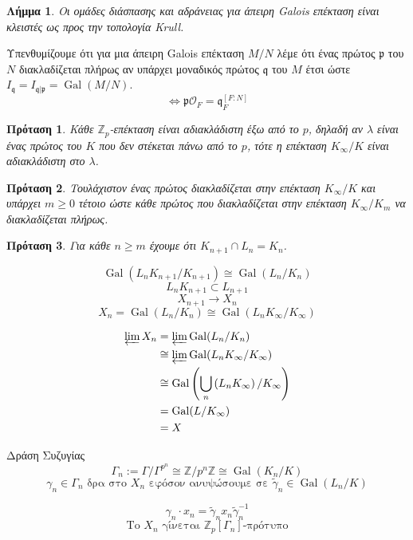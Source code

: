 \documentclass{beamer}
\newcommand {\tl}{\textlatin}
\newcommand{\Gal}{\operatorname{Gal}}
\newcommand{\Z}{\mathbb{Z}}
\newtheorem{lhmma}{Λήμμα}
\newtheorem{prop}{Πρόταση}
\begin{document}
\begin{frame}
\begin{lhmma}
Οι ομάδες διάσπασης και αδράνειας για άπειρη \tl{Galois} επέκταση είναι κλειστές ως προς την τοπολογία \tl{Krull}.
\end{lhmma}
\pause
Υπενθυμίζουμε ότι για μια άπειρη \tl{Galois} επέκταση $M/N$ λέμε ότι ένας πρώτος $\mathfrak{p}$ του $N$ διακλαδίζεται πλήρως αν υπάρχει μοναδικός πρώτος $\mathfrak{q}$ του $M$ έτσι ώστε $I_{\mathfrak q} = I_{\mathfrak q | \mathfrak p} = \Gal(M/N).$
$$\iff \mathfrak p \mathcal{O}_F = \mathfrak q_F^{[F:N]}$$
\pause 

\begin{prop}
    Κάθε $\Z_p$-επέκταση είναι αδιακλάδιστη έξω από το $p$, δηλαδή αν $\lambda$ είναι ένας πρώτος του $K$ που δεν στέκεται πάνω από το $p$, τότε η επέκταση $K_{\infty}/K$ είναι αδιακλάδιστη στο $\lambda$.
\end{prop}

\end{frame}

\begin{frame}
\begin{prop}
    Τουλάχιστον ένας πρώτος διακλαδίζεται στην επέκταση $K_\infty/K$ και υπάρχει $m\geq 0$ τέτοιο ώστε κάθε πρώτος που διακλαδίζεται στην επέκταση $K_\infty/K_m$ να διακλαδίζεται πλήρως.
\end{prop}

\pause
\begin{prop}
        Για κάθε $n\geq m$ έχουμε ότι $K_{n+1}\cap L_n = K_n$.
    \end{prop}
\pause
$$\Gal(L_nK_{n+1}/K_{n+1}) \cong \Gal(L_n/K_n)$$
$$L_n K_{n+1} \subset L_{n+1}$$
$$X_{n+1} \longrightarrow X_n$$
$$X_n = \Gal(L_n/K_n) \cong \Gal(L_nK_\infty/K_\infty)$$

\end{frame}

\begin{frame}
\begin{align*}
    \varprojlim X_n &= \varprojlim \Gal(L_n/K_n) \\
    &\cong  \varprojlim \Gal(L_n K_\infty/K_\infty) \\
    &\cong \Gal \left( \bigcup\limits_n\left(L_n K_\infty\right)/K_\infty \right) \\
    &= \Gal(L/K_\infty) \\
    &= X
\end{align*}
\pause 
\begin{block}{Δράση Συζυγίας}
$$\Gamma_n := \Gamma/\Gamma^{p^n} \cong \Z/p^n\Z \cong \Gal(K_n/K)$$
$$\gamma_n \in \Gamma_n \text{ δρα στο } X_n \text{ εφόσον ανυψώσουμε σε } \tilde{\gamma}_n \in \Gal(L_n/K)$$

$$\gamma_n \cdot x_n = \tilde{\gamma}_n x_n \tilde{\gamma}_n^{-1}$$
$$\text{Το } X_n \text{ γίνεται } \Z_p[\Gamma_n]\text{-πρότυπο}$$
\end{block}

\end{frame}
\end{document}
